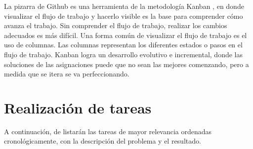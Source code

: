La pizarra de Github es una herramienta de la metodología Kanban \cite{BookKanban}, en donde visualizar el flujo de trabajo y hacerlo visible es la base para comprender cómo avanza el trabajo. Sin comprender el flujo de trabajo, realizar los cambios adecuados es más difícil. Una forma común de visualizar el flujo de trabajo es el uso de columnas. Las columnas representan los diferentes estados o pasos en el flujo de trabajo. Kanban logra un desarrollo evolutivo e incremental, donde las soluciones de las asignaciones puede que no sean las mejores comenzando, pero a medida que se itera se va perfeccionando.

\section{Realización de tareas}
A continuación, de listarán las tareas de mayor relevancia ordenadas cronológicamente, con la descripción del problema y el resultado.

